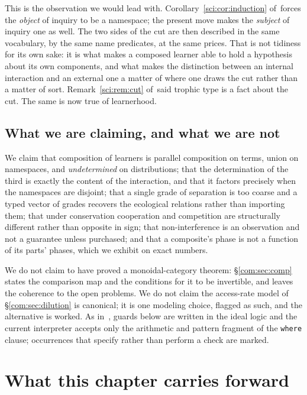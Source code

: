 \begin{remark}\label{com:knower-known-become-one}
This is the observation we would lead with. Corollary~\ref{sci:cor:induction} of~\chSci forces the
\emph{object} of inquiry to be a namespace; the present move makes the \emph{subject} of inquiry
one as well. The two sides of the cut are then described in the same vocabulary, by the same name
predicates, at the same prices. That is not tidiness for its own sake: it is what makes a
composed learner able to hold a hypothesis about its own components, and what makes the
distinction between an internal interaction and an external one a matter of where one draws the
cut rather than a matter of sort. Remark~\ref{sci:rem:cut} of~\chSci said trophic type is a fact about
the cut. The same is now true of learnerhood.
\end{remark}

\subsection{What we are claiming, and what we are not}\label{com:S1.3}

We claim that composition of learners is parallel composition on terms, union on namespaces, and
\emph{undetermined} on distributions; that the determination of the third is exactly the content
of the interaction, and that it factors precisely when the namespaces are disjoint; that a single
grade of separation is too coarse and a typed vector of grades recovers the ecological relations
rather than importing them; that under conservation cooperation and competition are structurally
different rather than opposite in sign; that non-interference is an observation and not a
guarantee unless purchased; and that a composite's phase is not a function of its parts' phases,
which we exhibit on exact numbers.

We do not claim to have proved a monoidal-category theorem: \S\ref{com:sec:comp} states the
comparison map and the conditions for it to be invertible, and leaves the coherence to the
open problems. We do not claim the access-rate model of \S\ref{com:sec:dilution} is canonical; it is
one modeling choice, flagged as such, and the alternative is worked. As in~\chGame, guards
below are written in the ideal logic and the current interpreter accepts only the arithmetic and
pattern fragment of the \texttt{where} clause; occurrences that specify rather than perform a
check are marked.

\section{What this chapter carries forward}\label{com:S2}

